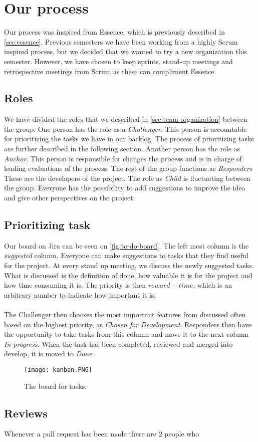 \section{Our process}
Our process was inspired from Essence, which is previously described in \autoref{sec:essence}.
Previous semesters we have been working from a highly Scrum inspired process, but we decided that we wanted to try a new organization this semester.
However, we have chosen to keep sprints, stand-up meetings and retrospective meetings from Scrum as these can compliment Essence.


\subsection{Roles}
We have divided the roles that we described in \autoref{sec:team-organization} between the group.
One person has the role as a \textit{Challenger}.
This person is accountable for prioritizing the tasks we have in our backlog.
The process of prioritizing tasks are further described in the following section.
Another person has the role as \textit{Anchor}.
This person is responsible for changes the process and is in charge of leading evaluations of the process.
The rest of the group functions as \textit{Responders}
These are the developers of the project.
The role as \textit{Child} is fluctuating between the group.
Everyone has the possibility to add suggestions to improve the idea and give other perspectives on the project.


\subsection{Prioritizing task}
Our board on Jira can be seen on \autoref{fig:to-do-board}.
The left most column is the \textit{suggested} column.
Everyone can make suggestions to tasks that they find useful for the project.
At every stand up meeting, we discuss the newly suggested tasks.
What is discussed is the definition of done, how valuable it is for the project and how time consuming it is.
The priority is then $reward - time$, which is an arbitrary number to indicate how important it is.
\\\\
The Challenger then chooses the most important features from discussed often based on the highest priority, as \textit{Chosen for Development}.
Responders then have the opportunity to take tasks from this column and move it to the next column \textit{In progress}.
When the task has been completed, reviewed and merged into develop, it is moved to \textit{Done}.
\begin{figure}[H]
    \centering
    \texttt{[image: kanban.PNG]}
    \caption{The board for tasks.}
    \label{fig:to-do-board}
\end{figure}

\subsection{Reviews}
Whenever a pull request has been made there are 2 people who 
